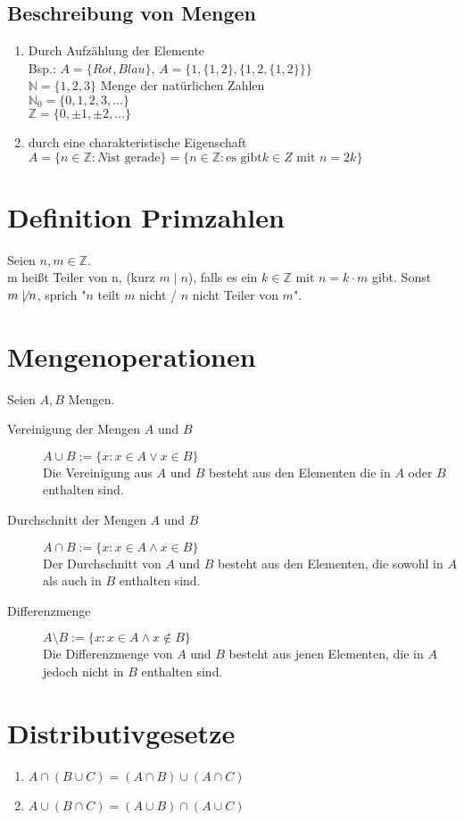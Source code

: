 \subsection{Beschreibung von Mengen}
\begin{enumerate}
\item Durch Aufzählung der Elemente\\
Bsp.: $A = \{Rot, Blau\}$, $A = \{1, \{1, 2\}, \{1, 2,\{1, 2\} \}\}$\\
$\mathbb{N} = \{1, 2, 3\}$ Menge der natürlichen Zahlen\\
$\mathbb{N}_0 = \{0, 1, 2, 3,...\}$\\
$\mathbb{Z} = \{0, \pm 1, \pm 2,...\}$
\item durch eine charakteristische Eigenschaft\\
$A = \{n \in \mathbb{Z}: N \text{ist gerade}\} = \{n \in \mathbb{Z}: \text{es gibt} k \in Z \text{ mit } n = 2k\}$
\end{enumerate}
\section{Definition Primzahlen}
Seien $n, m \in \mathbb{Z}$.\\
m heißt Teiler von n, (kurz $m\mid n$), falls es ein $k \in \mathbb{Z}$ mit $n = k \cdot m$ gibt. Sonst $m \not\mid n$, sprich "$n$ teilt $m$ nicht / $n$ nicht Teiler von $m$".
\section{Mengenoperationen}
Seien $A, B$ Mengen.
\begin{description}
\item[Vereinigung der Mengen $A$ und $B$]{$A \cup B := \{x: x \in A \vee x\in B\}$\\
Die Vereinigung aus $A$ und $B$ besteht aus den Elementen die in $A$ oder $B$ enthalten sind.}
\item[Durchschnitt der Mengen $A$ und $B$] {$A \cap B := \{x: x \in A \wedge x \in B\}$\\
Der Durchschnitt von $A$ und $B$ besteht aus den Elementen, die sowohl in $A$ als auch in $B$ enthalten sind.}
\item[Differenzmenge]{$A \setminus B := \{x: x \in A \wedge x \notin B\}$\\
Die Differenzmenge von $A$ und $B$ besteht aus jenen Elementen, die in $A$ jedoch nicht in $B$ enthalten sind.}
\end{description}
\section{Distributivgesetze}
\begin{enumerate}
\item $A \cap (B \cup C) = (A \cap B) \cup (A \cap C)$
\item $A \cup (B \cap C) = (A \cup B) \cap (A \cup C)$
\end{enumerate}
